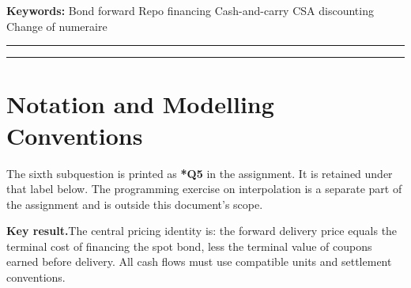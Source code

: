 \documentclass[11pt]{article}
\newcommand{\keynote}[1]{\par\medskip\noindent\textbf{\sffamily\color{NYUviolet}Key result.}\enspace #1\par\medskip}
\numberwithin{equation}{section}
\begin{document}
\begin{abstract}
\noindent
This report analyses a one-year forward purchase of a specified U.S. Treasury
bond. It identifies client motivations and essential contract terms, then
constructs a hedge using the spot bond and matched repo financing. The fair
delivery price is derived as financed spot cost less the accumulated value of
interim coupons. The original contract is marked to market using the current
replacement forward price and the assignment's CSA discount factor. A funding
advantage explains how a dealer can earn a spread while offering competitive
terms, subject to residual liquidity, basis and counterparty risks. Finally,
prepaid-forward replication and a change of numeraire establish the
risk-neutral pricing result under a common financing and discounting curve.
Coupon entitlement, price units and compounding conventions are stated
explicitly throughout.
\end{abstract}
\vspace{4pt}
{\small\noindent\textbf{\sffamily Keywords:}\;
Bond forward \textbullet\; Repo financing \textbullet\; Cash-and-carry
\textbullet\; CSA discounting \textbullet\; Change of numeraire}
\vspace{8pt}
{\color{rulegrey}\hrule}
\setcounter{tocdepth}{1}
\renewcommand{\contentsname}{\sffamily\large\bfseries\color{NYUviolet}Contents}
{\small\tableofcontents}
{\color{rulegrey}\hrule}
\clearpage
\section*{Notation and Modelling Conventions}
The sixth subquestion is printed as \textbf{*Q5} in the assignment. It is retained under that label below. The programming exercise on interpolation is a separate part of the assignment and is outside this document's scope.

\keynote{The central pricing identity is: the forward delivery price equals the terminal cost of financing the spot bond, less the terminal value of coupons earned before delivery. All cash flows must use compatible units and settlement conventions.}
\end{document}
